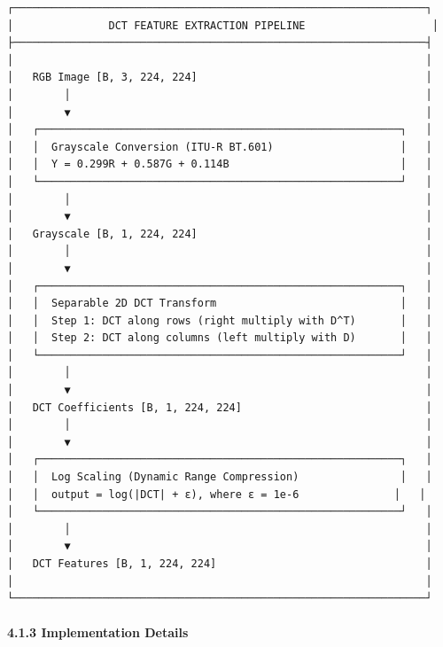 \begin{verbatim}
┌─────────────────────────────────────────────────────────────────┐
│               DCT FEATURE EXTRACTION PIPELINE                    │
├─────────────────────────────────────────────────────────────────┤
│                                                                 │
│   RGB Image [B, 3, 224, 224]                                    │
│        │                                                        │
│        ▼                                                        │
│   ┌─────────────────────────────────────────────────────────┐   │
│   │  Grayscale Conversion (ITU-R BT.601)                    │   │
│   │  Y = 0.299R + 0.587G + 0.114B                           │   │
│   └─────────────────────────────────────────────────────────┘   │
│        │                                                        │
│        ▼                                                        │
│   Grayscale [B, 1, 224, 224]                                    │
│        │                                                        │
│        ▼                                                        │
│   ┌─────────────────────────────────────────────────────────┐   │
│   │  Separable 2D DCT Transform                             │   │
│   │  Step 1: DCT along rows (right multiply with D^T)       │   │
│   │  Step 2: DCT along columns (left multiply with D)       │   │
│   └─────────────────────────────────────────────────────────┘   │
│        │                                                        │
│        ▼                                                        │
│   DCT Coefficients [B, 1, 224, 224]                             │
│        │                                                        │
│        ▼                                                        │
│   ┌─────────────────────────────────────────────────────────┐   │
│   │  Log Scaling (Dynamic Range Compression)                │   │
│   │  output = log(|DCT| + ε), where ε = 1e-6               │   │
│   └─────────────────────────────────────────────────────────┘   │
│        │                                                        │
│        ▼                                                        │
│   DCT Features [B, 1, 224, 224]                                 │
│                                                                 │
└─────────────────────────────────────────────────────────────────┘
\end{verbatim}

\paragraph{4.1.3 Implementation Details}\label{implementation-details}


